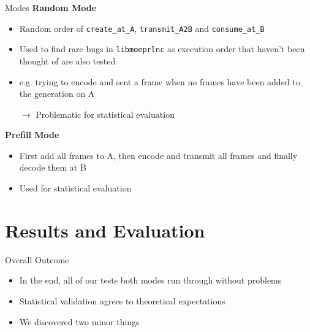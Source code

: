\documentclass[t]{beamer} %
\begin{document}
\begin{frame}{Modes}
	\textbf{Random Mode}
	\begin{itemize}
		\item Random order of \texttt{create\_at\_A}, \texttt{transmit\_A2B} and \texttt{consume\_at\_B}
		\item Used to find rare bugs in \texttt{libmoeprlnc} as execution order that haven't been thought of are also tested
		\item e.g. trying to encode and sent a frame when no frames have been added to the generation on A
		      \pause
		\item[$\rightarrow$] Problematic for statistical evaluation
	\end{itemize}
	\pause
	\textbf{Prefill Mode}
	\begin{itemize}
		\item First add all frames to A, then encode and transmit all frames and finally decode them at B
		\item Used for statistical evaluation
	\end{itemize}
\end{frame}

\section{Results and Evaluation}

\begin{frame}{Overall Outcome}
	\begin{itemize}
		\item In the end, all of our tests both modes run through without problems
		\item Statistical validation agrees to theoretical expectations
		\item We discovered two minor things
	\end{itemize}
\end{frame}
\end{document}
